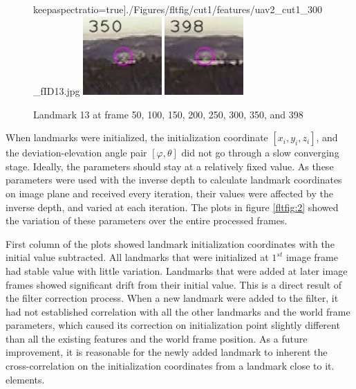 \begin{figure}[h]
keepaspectratio=true]{./Figures/fltfig/cut1/features/uav2_cut1_300_fID13.jpg}
\includegraphics[width=3cm,
keepaspectratio=true]{./Figures/fltfig/cut1/features/uav2_cut1_350_fID13.jpg}
\includegraphics[width=3cm,
keepaspectratio=true]{./Figures/fltfig/cut1/features/uav2_cut1_398_fID13.jpg}
\caption{Landmark 13 at frame 50, 100, 150, 200, 250, 300, 350, and 398}
\label{fltfig:1_1}
\end{figure}

When landmarks were initialized, the initialization coordinate $[x_i,
y_i, z_i]$, and the deviation-elevation angle pair $[\varphi, \theta]$
did not go through a slow converging stage. Ideally, the parameters
should stay at a relatively fixed value. As these parameters were used
with the inverse depth to calculate landmark coordinates on image
plane and received every iteration, their values were affected by the
inverse depth, and varied at each iteration. The plots in figure
\ref{fltfig:2} showed the variation of these parameters over the
entire processed frames.

First column of the plots showed landmark initialization coordinates
with the initial value subtracted. All landmarks that were initialized
at $1^{st}$ image frame had stable value with little variation.
Landmarks that were added at later image frames showed significant
drift from their initial value. This is a direct result of the filter
correction process. When a new landmark were added to the filter, it
had not established correlation with all the other landmarks and the
world frame parameters, which caused its correction on initialization
point slightly different than all the existing features and the world
frame position. As a future improvement, it is reasonable for the
newly added landmark to inherent the cross-correlation on the
initialization coordinates from a landmark close to it. elements.


